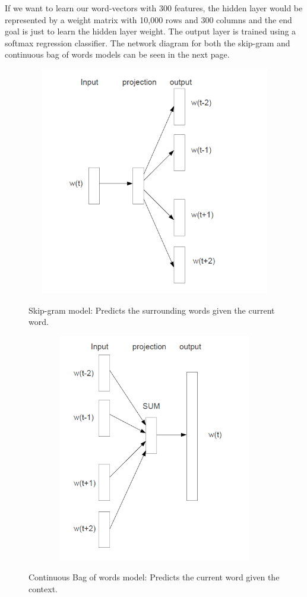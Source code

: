 If we want to learn our word-vectors with 300 features, the hidden layer would be represented by a weight matrix with 10,000 rows and 300 columns and the end goal is just to learn the hidden layer weight. The output layer is trained using a softmax regression classifier. The network diagram for both the skip-gram and continuous bag of words models can be seen in the next page.

\begin{figure}[htbp]
\centering
\includegraphics[width=16cm, height=10cm]{images/skip-gram.PNG}\\
\centering
\caption{Skip-gram model: Predicts the surrounding words given the current word.}
\label{fig:foo}
\end{figure}

\begin{figure}[htbp]
\centering
\includegraphics[width=16cm, height=10cm]{images/CBOW.PNG}\\
\centering
\caption{Continuous Bag of words model: Predicts the current word given the context.}
\label{fig:foo}
\end{figure}

